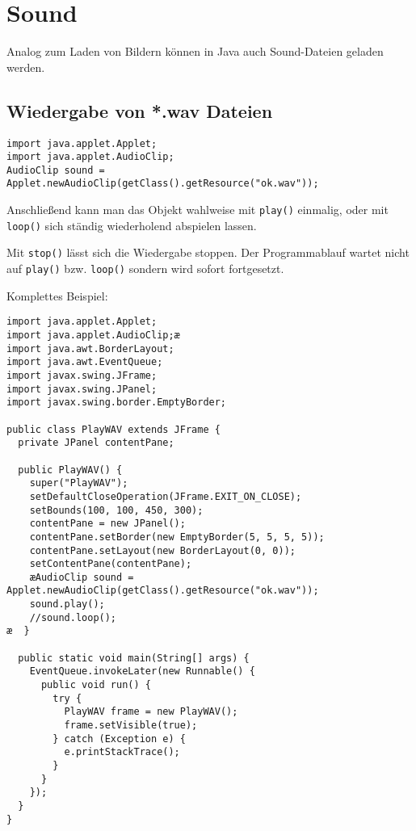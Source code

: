 \chapter{Sound}
\renewcommand{\chaptertitle}{Sound}

\lehead[]{\sf\hspace*{-2.00cm}\textcolor{white}{\colorbox{lightblue}{\makebox[1.60cm][r]{\thechapter}}}\hspace{0.17cm}\textcolor{lightblue}{\chaptertitle}}
\rohead[]{\textcolor{lightblue}{\chaptertitle}\sf\hspace*{0.17cm}\textcolor{white}{\colorbox{lightblue}{\makebox[1.60cm][l]{\thechapter}}}\hspace{-2.00cm}}
\rehead[]{\textcolor{lightblue}{AvHG, Inf, My}}
\lohead[]{\textcolor{lightblue}{AvHG, Inf, My}}

\lstset{style=myJava}

Analog zum Laden von Bildern können in Java auch Sound-Dateien geladen werden.

\section{Wiedergabe von *.wav Dateien}

\begin{lstlisting}
import java.applet.Applet;
import java.applet.AudioClip;
AudioClip sound = Applet.newAudioClip(getClass().getResource("ok.wav"));
\end{lstlisting}

Anschließend kann man das  Objekt wahlweise mit
\lstinline|play()| einmalig, oder mit \lstinline|loop()| sich ständig
wiederholend abspielen lassen. 

Mit \lstinline|stop()| lässt sich die Wiedergabe stoppen. Der Programmablauf
wartet nicht auf \lstinline|play()| bzw. \lstinline|loop()| sondern wird sofort
fortgesetzt.

Komplettes Beispiel:

\begin{lstlisting}
import java.applet.Applet;
import java.applet.AudioClip;æ
import java.awt.BorderLayout;
import java.awt.EventQueue;
import javax.swing.JFrame;
import javax.swing.JPanel;
import javax.swing.border.EmptyBorder;

public class PlayWAV extends JFrame {
  private JPanel contentPane;

  public PlayWAV() {
    super("PlayWAV");
    setDefaultCloseOperation(JFrame.EXIT_ON_CLOSE);
    setBounds(100, 100, 450, 300);
    contentPane = new JPanel();
    contentPane.setBorder(new EmptyBorder(5, 5, 5, 5));
    contentPane.setLayout(new BorderLayout(0, 0));
    setContentPane(contentPane);
    æAudioClip sound = Applet.newAudioClip(getClass().getResource("ok.wav"));
    sound.play();
    //sound.loop();
æ  }

  public static void main(String[] args) {
    EventQueue.invokeLater(new Runnable() {
      public void run() {
        try {
          PlayWAV frame = new PlayWAV();
          frame.setVisible(true);
        } catch (Exception e) {
          e.printStackTrace();
        }
      }
    });
  }
}
\end{lstlisting}


